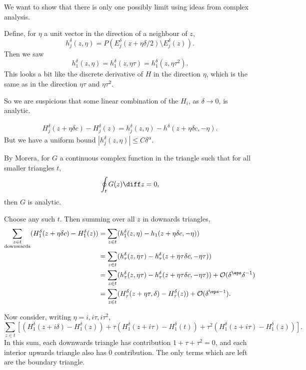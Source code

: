 \documentclass[12pt]{article}
\begin{document}
We want to show that there is only one possibly limit using ideas from complex analysis.

Define, for $\eta$ a unit vector in the direction of a neighbour of $z$,
\[
	h_j^{\delta}(z, \eta) = P(E_j^{\delta}(z+\eta \delta/2) \setminus E_j^{\delta}(z)).
\]
Then we saw
\[
h_1^{\delta}(z, \eta) = h_1^{\delta}(z, \eta \tau) = h_1^{\delta}(z, \eta \tau^2).
\]
This looks a bit like the discrete derivative of $H$ in the direction $\eta$, which is the same as in the direction $\eta \tau$ and $\eta \tau^2$.

So we are suspicious that some linear combination of the $H_i$, as $\delta \to 0$, is analytic.

\begin{remark}
	\begin{align*}
		H_j^{\delta}(z + \eta \delta c) - H_j^{\delta}(z) = h_j^{\delta}(z, \eta) - h^{\delta}(z + \eta \delta c, - \eta).
	\end{align*}
	But we have a uniform bound $|h_j^{\delta}(z, \eta)| \leq C \delta^{\alpha}$.
\end{remark}

By Morera, for $G$ a continuous complex function in the triangle such that for all smaller triangles $t$,
\[
\oint_t G(z) \diff z = 0,
\]
then $G$ is analytic.

Choose any such $t$. Then summing over all $z$ in downards triangles,
\begin{align*}
	\sum_{\substack{z \in t \\ \text{downwards}}} (H_1^{\delta}(z + \eta \delta c) - H_1^{\delta}(z)) &= \sum_{z \in t} (h_1^{\delta}(z, \eta) - h_1(z + \eta \delta c, - \eta)) \\
													  &= \sum_{z \in t} (h_\tau^{\delta}(z, \eta \tau) - h_\tau^{\delta}(z + \eta \tau \delta c, - \eta \tau)) \\
													  &= \sum_{z \in t}(h_\tau^{\delta}(z, \eta \tau) - h_\tau^{\delta} (z + \eta \tau \delta c, - \eta \tau)) + \mathcal{O}(\delta^{\eps} \delta^{-1}) \\
													  &= \sum_{z \in t}(H_\tau^{\delta}(z + \eta \tau, \delta) - H_{\tau}^{\delta}(z)) + \mathcal{O}(\delta^{\eps - 1}).
\end{align*}

Now consider, writing $\eta = i, i \tau, i \tau^2$,
\[
	\sum_{z \in t} [(H_1^{\delta}(z + i \delta) - H_1^{\delta}(z)) + \tau(H_1^{\delta}(z + i \tau) - H_1^{\delta}(t)) + \tau^2(H_1^{\delta}(z + i \tau) - H_1^{\delta}(z))].
\]
In this sum, each downwards triangle has contribution $1 + \tau + \tau^2 = 0$, and each interior upwards triangle also has $0$ contribution. The only terms which are left are the boundary triangle.
\end{document}
